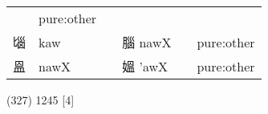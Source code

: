 \documentclass[14pt,a4paper]{scrartcl}
\begin{document}
\begin{longtable}[c]{@{}llllll@{}}
\begin{minipage}[t]{0.14\columnwidth}
\strut\end{minipage} &
\begin{minipage}[t]{0.14\columnwidth}\raggedright\strut
pure:other
\strut\end{minipage}\tabularnewline
\begin{minipage}[t]{0.14\columnwidth}\raggedright\strut
匘
\strut\end{minipage} &
\begin{minipage}[t]{0.14\columnwidth}\raggedright\strut
kaw
\strut\end{minipage} &
\begin{minipage}[t]{0.14\columnwidth}\raggedright\strut
\strut\end{minipage} &
\begin{minipage}[t]{0.14\columnwidth}\raggedright\strut
腦 nawX
\strut\end{minipage} &
\begin{minipage}[t]{0.14\columnwidth}\raggedright\strut
\strut\end{minipage} &
\begin{minipage}[t]{0.14\columnwidth}\raggedright\strut
pure:other
\strut\end{minipage}\tabularnewline
\begin{minipage}[t]{0.14\columnwidth}\raggedright\strut
𥁕
\strut\end{minipage} &
\begin{minipage}[t]{0.14\columnwidth}\raggedright\strut
nawX
\strut\end{minipage} &
\begin{minipage}[t]{0.14\columnwidth}\raggedright\strut
\strut\end{minipage} &
\begin{minipage}[t]{0.14\columnwidth}\raggedright\strut
媼 'awX
\strut\end{minipage} &
\begin{minipage}[t]{0.14\columnwidth}\raggedright\strut
\strut\end{minipage} &
\begin{minipage}[t]{0.14\columnwidth}\raggedright\strut
pure:other
\strut\end{minipage}\tabularnewline
\bottomrule
\end{longtable}

(327) 1245 {[}4{]}
\end{document}
